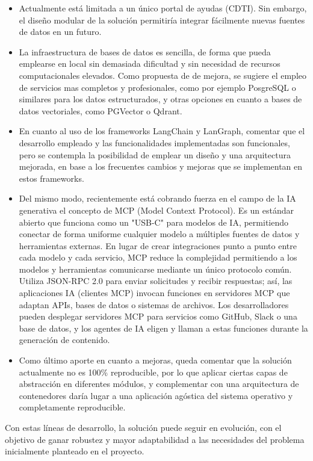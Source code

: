\begin{itemize}
    \item Actualmente está limitada a un único portal de ayudas (CDTI). 
    Sin embargo, el diseño modular de la solución permitiría integrar fácilmente nuevas fuentes de datos en un futuro.
    \item La infraestructura de bases de datos es sencilla, de forma que pueda emplearse en local sin demasiada dificultad y sin necesidad de recursos computacionales elevados.
    Como propuesta de de mejora, se sugiere el empleo de servicios mas completos y profesionales, como por ejemplo PosgreSQL o similares para los datos estructurados, y otras opciones en cuanto a bases de datos vectoriales, como PGVector o Qdrant. 
    \item En cuanto al uso de los frameworks LangChain y LanGraph, comentar que el desarrollo empleado y las funcionalidades implementadas son funcionales, pero se contempla la posibilidad de emplear un diseño y una arquitectura mejorada, en base a los frecuentes cambios y mejoras que se implementan en estos frameworks.
    \item Del mismo modo, recientemente está cobrando fuerza en el campo de la IA generativa el concepto de MCP (Model Context Protocol). 
    Es un estándar abierto que funciona como un "USB-C" para modelos de IA, permitiendo conectar de forma uniforme cualquier modelo a múltiples fuentes de datos y herramientas externas. 
    En lugar de crear integraciones punto a punto entre cada modelo y cada servicio, MCP reduce la complejidad permitiendo a los modelos y herramientas comunicarse mediante un único protocolo común. 
    Utiliza JSON-RPC 2.0 para enviar solicitudes y recibir respuestas; así, las aplicaciones IA (clientes MCP) invocan funciones en servidores MCP que adaptan APIs, bases de datos o sistemas de archivos. 
    Los desarrolladores pueden desplegar servidores MCP para servicios como GitHub, Slack o una base de datos, y los agentes de IA eligen y llaman a estas funciones durante la generación de contenido. 
    \item Como último aporte en cuanto a mejoras, queda comentar que la solución actualmente no es 100\% reproducible, por lo que aplicar ciertas capas de abstracción en diferentes módulos, y complementar con una arquitectura de contenedores daría lugar a una aplicación agóstica del sistema operativo y completamente reproducible.
\end{itemize}

Con estas líneas de desarrollo, la solución puede seguir en evolución, con el objetivo de ganar robustez y mayor adaptabilidad a las necesidades del problema inicialmente planteado en el proyecto.
